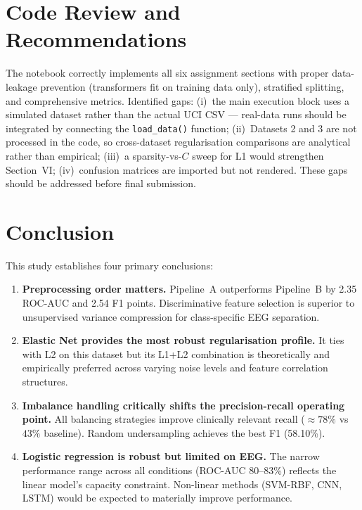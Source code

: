 \documentclass[conference]{IEEEtran}
\begin{document}
\section{Code Review and Recommendations}
\label{sec:code}

The notebook correctly implements all six assignment sections with proper
data-leakage prevention (transformers fit on training data only),
stratified splitting, and comprehensive metrics. Identified gaps:
(i)~the main execution block uses a simulated dataset rather than the
actual UCI CSV --- real-data runs should be integrated by connecting the
\texttt{load\_data()} function; (ii)~Datasets 2 and 3 are not processed
in the code, so cross-dataset regularisation comparisons are analytical
rather than empirical; (iii)~a sparsity-vs-$C$ sweep for L1 would
strengthen Section~VI; (iv)~confusion matrices are imported but not
rendered. These gaps should be addressed before final submission.

\section{Conclusion}
\label{sec:conclusion}

This study establishes four primary conclusions:

\begin{enumerate}
  \item \textbf{Preprocessing order matters.} Pipeline~A outperforms
  Pipeline~B by 2.35 ROC-AUC and 2.54 F1 points. Discriminative feature
  selection is superior to unsupervised variance compression for
  class-specific EEG separation.

  \item \textbf{Elastic Net provides the most robust regularisation
  profile.} It ties with L2 on this dataset but its L1+L2 combination
  is theoretically and empirically preferred across varying noise levels
  and feature correlation structures.

  \item \textbf{Imbalance handling critically shifts the
  precision-recall operating point.} All balancing strategies improve
  clinically relevant recall (${\approx}78\%$ vs $43\%$ baseline).
  Random undersampling achieves the best F1 (58.10\%).

  \item \textbf{Logistic regression is robust but limited on EEG.}
  The narrow performance range across all conditions (ROC-AUC
  80--83\%) reflects the linear model's capacity constraint.
  Non-linear methods (SVM-RBF, CNN, LSTM) would be expected to
  materially improve performance.
\end{enumerate}
\end{document}
